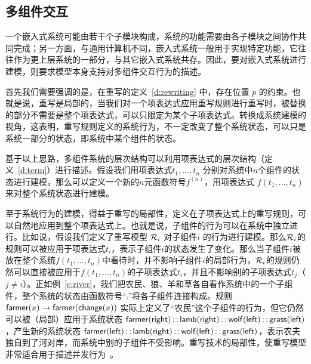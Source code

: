 \subsection{多组件交互}
\label{ss:multi-component}

一个嵌入式系统可能由若干个子模块构成，系统的功能需要由各子模块之间协作共同完成；另一方面，与通用计算机不同，嵌入式系统一般用于实现特定功能，它往往作为更上层系统的一部分，与其它嵌入式系统共存。因此，要对嵌入式系统进行建模，则要求模型本身支持对多组件交互行为的描述。

首先我们需要强调的是，在重写的定义~\ref{d:rewriting} 中，存在位置 $p$ 的约束。也就是说，重写是局部的，当我们对一个项表达式应用重写规则进行重写时，被替换的部分不需要是整个项表达式，可以只限定为某个子项表达式。转换成系统建模的视角，这表明，重写规则定义的系统行为，不一定改变了整个系统状态，可以只是系统一部分的状态，即系统中某个组件的状态。

基于以上思路，多组件系统的层次结构可以利用项表达式的层次结构（定义~\ref{d:term}）进行描述。假设我们用项表达式$t_1,\ldots,t_n$ 分别对系统中$n$个组件的状态进行建模，那么可以定义一个新的$n$元函数符号$f^{(n)}$，用项表达式 $f(t_1,\ldots,t_n)$ 来对整个系统状态进行建模。

至于系统行为的建模，得益于重写的局部性，定义在子项表达式上的重写规则，可以自然地应用到整个项表达式上。也就是说，子组件的行为可以在系统中独立进行。比如说，假设我们定义了重写模型 $\mathcal{R}_i$ 对子组件$i$ 的行为进行建模。那么$\mathcal{R}_i$的规则可以被应用于项表达式$t_i$，表示子组件$i$的状态发生了变化。那么当子组件$i$被放在整个系统$f(t_1,\ldots,t_n)$中看待时，并不影响子组件$i$的局部行为，$\mathcal{R}_i$的规则仍然可以直接被应用于$f(t_1,\ldots,t_n)$的子项表达式$t_i$，并且不影响别的子项表达式$t_j$（$j\not=i$）。正如例~\ref{e:river}，我们把农民、狼、羊和草各自看作系统中的一个子组件，整个系统的状态由函数符号“$\comp$”将各子组件连接构成。规则$\operatorname{\mathsf{farmer}}(x) \rightarrow \operatorname{\mathsf{farmer}}(\operatorname{\mathsf{change}}(x))$ 实际上定义了“农民”这个子组件的行为，但它仍然可以被（局部）应用于系统状态 $\operatorname{\mathsf{farmer}}(\operatorname{\mathsf{right}}) \operatorname{\mathsf{::}} \operatorname{\mathsf{lamb}}(\operatorname{\mathsf{right}}) \operatorname{\mathsf{::}} \operatorname{\mathsf{wolf}}(\operatorname{\mathsf{left}}) \operatorname{\mathsf{::}} \operatorname{\mathsf{grass}}(\operatorname{\mathsf{left}})$，产生新的系统状态 $\operatorname{\mathsf{farmer}}(\operatorname{\mathsf{left}}) \operatorname{\mathsf{::}} \operatorname{\mathsf{lamb}}(\operatorname{\mathsf{right}}) \operatorname{\mathsf{::}} \operatorname{\mathsf{wolf}}(\operatorname{\mathsf{left}}) \operatorname{\mathsf{::}} \operatorname{\mathsf{grass}}(\operatorname{\mathsf{left}})$，表示农夫独自到了河对岸，而系统中别的子组件不受影响。重写技术的局部性，使重写模型非常适合用于描述并发行为~\cite{DBLP:journals/tcs/Marte-OlietM02}。


